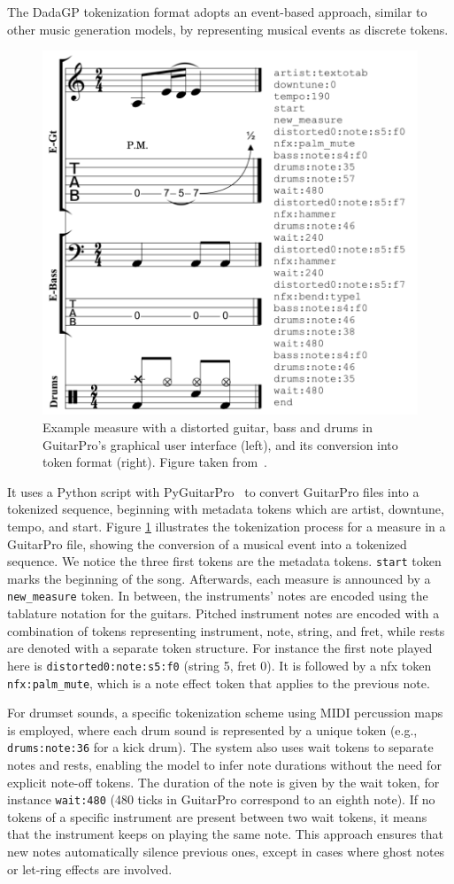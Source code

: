 The DadaGP tokenization format adopts an event-based approach, similar to other music generation models, by representing musical events as discrete tokens.

\begin{figure}[!ht]
    \centering
    \includegraphics[width=.43\linewidth]{../images-figures/dadagp_tokenization_example_measure.png}
    \caption{Example measure with a distorted guitar, bass and drums in GuitarPro's graphical user interface (left), and its conversion into token format (right). Figure taken from~\cite{sarmento_dadagp_2021}.}
    \label{fig:dadagp_tokenization}
\end{figure}

It uses a Python script with PyGuitarPro~\cite{abakumov_pyguitarpro_2014} to convert GuitarPro files into a tokenized sequence, beginning with metadata tokens which are artist, downtune, tempo, and start.
Figure \ref{fig:dadagp_tokenization} illustrates the tokenization process for a measure in a GuitarPro file, showing the conversion of a musical event into a tokenized sequence.
We notice the three first tokens are the metadata tokens. \texttt{start} token marks the beginning of the song.
Afterwards, each measure is announced by a \texttt{new\_measure} token.
In between, the instruments' notes are encoded using the tablature notation for the guitars.
Pitched instrument notes are encoded with a combination of tokens representing instrument, note, string, and fret, while rests are denoted with a separate token structure.
For instance the first note played here is \texttt{distorted0:note:s5:f0} (string 5, fret 0).
It is followed by a nfx token \texttt{nfx:palm\_mute}, which is a note effect token that applies to the previous note.

For drumset sounds, a specific tokenization scheme using MIDI percussion maps is employed, where each drum sound is represented by a unique token (e.g., \texttt{drums:note:36} for a kick drum).
The system also uses wait tokens to separate notes and rests, enabling the model to infer note durations without the need for explicit note-off tokens.
The duration of the note is given by the wait token, for instance \texttt{wait:480} (480 ticks in GuitarPro correspond to an eighth note).
If no tokens of a specific instrument are present between two wait tokens, it means that the instrument keeps on playing the same note.
This approach ensures that new notes automatically silence previous ones, except in cases where ghost notes or let-ring effects are involved.

